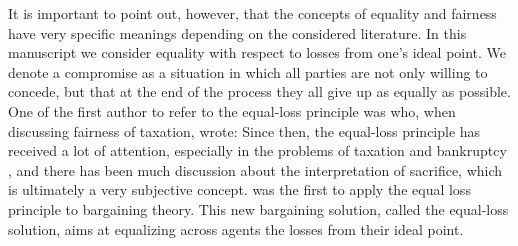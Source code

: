 It is important to point out, however, that the concepts of equality and fairness have very specific meanings depending on the considered literature. 
In this manuscript we consider equality with respect to losses from one's ideal point. 
We denote a compromise as a situation in which all parties are not only willing to concede, but that at the end of the process they all give up as equally as possible. 
One of the first author to refer to the equal-loss principle was \citet[p. 396]{Mill1849} who, when discussing fairness of taxation, wrote: \textit{} 
Since then, the equal-loss principle has received a lot of attention, especially in the problems of taxation \citep{Edgeworth1897,Young1987} and bankruptcy \citep{Herrero2001, Aumann1985}, and there has been much discussion about the interpretation of sacrifice, which is ultimately a very subjective concept. \citet{Chun1988} was the first to apply the equal loss principle to bargaining theory. This new bargaining solution, called the equal-loss solution, aims at equalizing across agents the losses from their ideal point.

